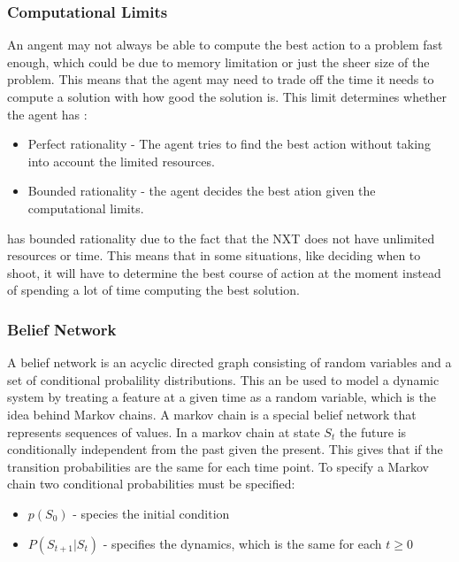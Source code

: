 

\subsubsection{Computational Limits}
An angent may not always be able to compute the best action to a problem fast
enough, which could be due to memory limitation or just the sheer size of the
problem. This means that the agent may need to trade off the time it needs to
compute a solution with how good the solution is. This limit determines whether
the agent has \citep[Ch. 1.5.8]{MIBook}:

\begin{itemize}
  \item Perfect rationality - The agent tries to find the best action without
  taking into account the limited resources.
  \item Bounded rationality - the agent decides the best ation given the
  computational limits.
\end{itemize}

\namep has bounded rationality due to the fact that the NXT does not have
unlimited resources or time. This means that in some situations, like deciding
when to shoot, it will have to determine the best course of action at the
moment instead of spending a lot of time computing the best solution.

\subsubsection{Belief Network}
A belief network is an acyclic directed graph consisting of random variables and
a set of conditional probalility distributions. This an be used to model a
dynamic system by treating a feature at a given time as a random variable, which
is the idea behind Markov chains. A markov chain is a special belief network
that represents sequences of values.
In a markov chain at state $S_t$ the future is conditionally independent from
the past given the present. This gives that if the transition probabilities are
the same for each time point. To specify a Markov chain two conditional
probabilities must be specified:
\begin{itemize}
  \item $p(S_0)$ - species the initial condition
  \item $P(S_{t+1}|S_t)$ - specifies the dynamics, which is the same for each $t
  \geq 0$
\end{itemize}

